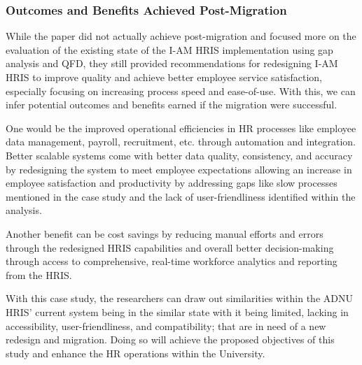         \subsubsection{Outcomes and Benefits Achieved Post-Migration}
        While the paper did not actually achieve post-migration and focused more on the evaluation of the existing state of the I-AM HRIS implementation using gap analysis and QFD, they still provided recommendations for redesigning I-AM HRIS to improve quality and achieve better employee service satisfaction, especially focusing on increasing process speed and ease-of-use. With this, we can infer potential outcomes and benefits earned if the migration were successful. 

        One would be the improved operational efficiencies in HR processes like employee data management, payroll, recruitment, etc. through automation and integration. Better scalable systems come with better data quality, consistency, and accuracy by redesigning the system to meet employee expectations allowing an increase in employee satisfaction and productivity by addressing gaps like slow processes mentioned in the case study and the lack of user-friendliness identified within the analysis.

        Another benefit can be cost savings by reducing manual efforts and errors through the redesigned HRIS capabilities and overall better decision-making through access to comprehensive, real-time workforce analytics and reporting from the HRIS.

        With this case study, the researchers can draw out similarities within the ADNU HRIS' current system being in the similar state with it being limited, lacking in accessibility, user-friendliness, and compatibility; that are in need of a new redesign and migration. Doing so will achieve the proposed objectives of this study and enhance the HR operations within the University.